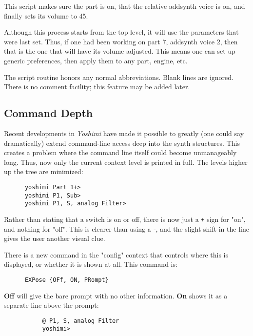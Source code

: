    This script makes sure the part is on, that the relative addsynth voice
   is on, and finally sets its volume to 45.

   Although this process starts from the top level, it will use the parameters
   that were last set.
   Thus, if one had been working on part 7, addsynth voice 2,
   then that is the one that will have its volume adjusted.
   This means one can set up generic preferences,
   then apply them to any part, engine, etc.

   The script routine honors any normal abbreviations.
   Blank lines are ignored.
   There is no comment facility; this feature may be added later.

\subsection{Command Depth}
\label{subsec:command_line_command_depth}

   Recent developments in \textsl{Yoshimi} have made it possible to greatly
   (one could say dramatically) extend command-line access deep into
   the synth structures.
   This creates a problem where the command line itself could become
   unmanageably long.
   Thus, now only the current context level is printed in full.
   The levels higher up the tree are minimized:

   \begin{verbatim}
      yoshimi Part 1+>
      yoshimi P1, Sub>
      yoshimi P1, S, analog Filter>
   \end{verbatim}

   Rather than stating that a switch is on or off,
   there is now just a \texttt{+} sign for "on", and nothing for "off".
   This is clearer than using a \textsl{-}, and the
   slight shift in the line gives the user another visual clue.

   There is a new command in the "config" context that controls where this is
   displayed, or whether it is shown at all.
   This command is:
   
   \begin{verbatim}
      EXPose {OFf, ON, PRompt}
   \end{verbatim}

   \textbf{Off} will give the bare prompt with no other information.
   \textbf{On} shows it as a separate line above the prompt:

   \begin{verbatim}
           @ P1, S, analog Filter
           yoshimi>
   \end{verbatim}

